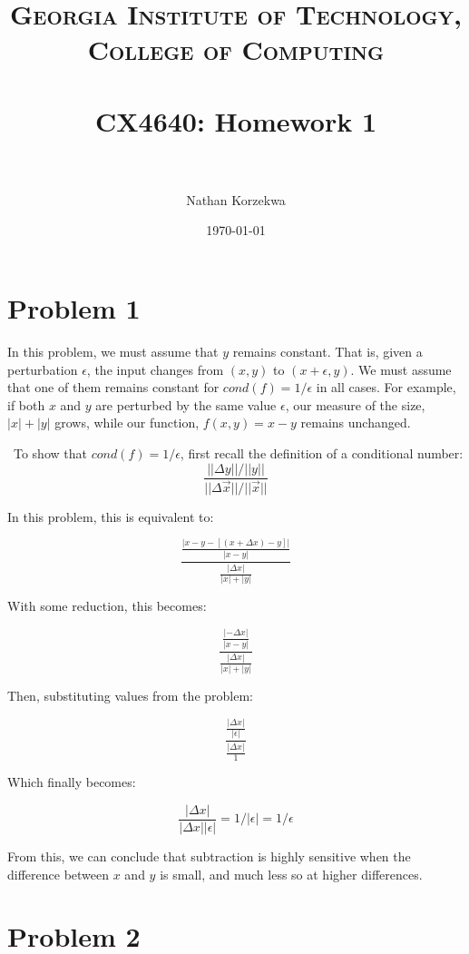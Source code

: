 \documentclass[paper=a4, fontsize=11pt]{scrartcl} %
\title {	
\normalfont \normalsize 
\textsc{Georgia Institute of Technology, College of Computing} \\ [25pt] %
\horrule{0.5pt} \\[0.4cm] %
\huge CX4640: Homework 1 \\ %
\horrule{2pt} \\[0.5cm] %
}
\author{Nathan Korzekwa} %
\date{\normalsize\today} %
\numberwithin{equation}{section} %
\numberwithin{figure}{section} %
\numberwithin{table}{section} %
\begin{document}
\maketitle %


\section{Problem 1}
In this problem, we must assume that $y$ remains constant. That is, given a perturbation $\epsilon$, the input changes from 
$(x, y)$ to $(x + \epsilon, y)$. We must assume that one of them remains constant for $cond(f) = 1/\epsilon$ in all cases.
For example, if both $x$ and $y$ are perturbed by the same value $\epsilon$, our measure of the size, $|x| + |y|$ grows, 
while our function, $f(x, y) = x - y$ remains unchanged.

\
To show that $cond(f) = 1/\epsilon$, first recall the definition of a conditional number:
$$
	\frac{||\Delta{y}|| / ||y||}{||\Delta{\vec{x}}||/||\vec{x}||}
$$

In this problem, this is equivalent to:

$$
	\frac{
			\frac{|x - y - [(x + \Delta{x}) - y]|}{|x - y|}
		 }
		 {
		 	\frac{|\Delta{x}|}{|x| + |y|}
		 }
$$

With some reduction, this becomes:

$$
	\frac{
			\frac{|-\Delta{x}|}{|x - y|}
		 }
		 {
		 	\frac{|\Delta{x}|}{|x| + |y|}
		 }	
$$

Then, substituting values from the problem:

$$
	\frac{
			\frac{|\Delta{x}|}{|\epsilon|}
		 }
		 {
		 	\frac{|\Delta{x}|}{1}
		 }	
$$

Which finally becomes:

$$
	\frac{|\Delta{x}|}{|\Delta{x}||\epsilon|} = 1/|\epsilon| = 1/\epsilon 
$$

From this, we can conclude that subtraction is highly sensitive when the difference between $x$ and $y$ is small, and much less so at higher differences.


\section{Problem 2}
\end{document}
